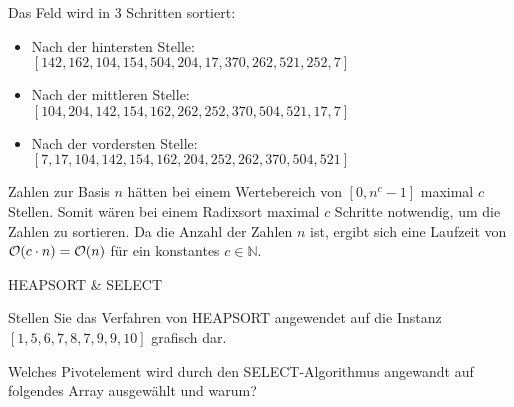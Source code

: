 \documentclass{exercisesheet}
\begin{document}
\begin{solutions}
  \item Das Feld wird in 3 Schritten sortiert:
  \begin{itemize}
    \item Nach der hintersten Stelle: $[142, 162, 104, 154, 504, 204, 17, 370, 262, 521, 252, 7]$
    \item Nach der mittleren Stelle: $[104, 204, 142, 154, 162, 262, 252, 370, 504, 521, 17, 7]$
    \item Nach der vordersten Stelle: $[7, 17, 104, 142, 154, 162, 204, 252, 262, 370, 504, 521]$
  \end{itemize}
  \item Zahlen zur Basis $n$ hätten bei einem Wertebereich von $[0,n^c-1]$ maximal $c$ Stellen. Somit wären bei einem Radixsort maximal $c$ Schritte notwendig, um die Zahlen zu sortieren. Da die Anzahl der Zahlen $n$ ist, ergibt sich eine Laufzeit von $\mathcal{O}(c\cdot n)=\mathcal{O}(n)$ für ein konstantes $c\in \mathbb{N}$.
\end{solutions}

\begin{exercises}{HEAPSORT \& SELECT}
\item Stellen Sie das Verfahren von HEAPSORT angewendet auf die Instanz $[1,5,6,7,8,7,9,9,10]$ grafisch dar.
\item Welches Pivotelement wird durch den SELECT-Algorithmus angewandt auf folgendes Array ausgewählt und warum?
\begin{equation*}
  [8,22,2,6,15,11,12,1,13,9,7,55,3,30,41]
\end{equation*}
\end{exercises}
\end{document}
